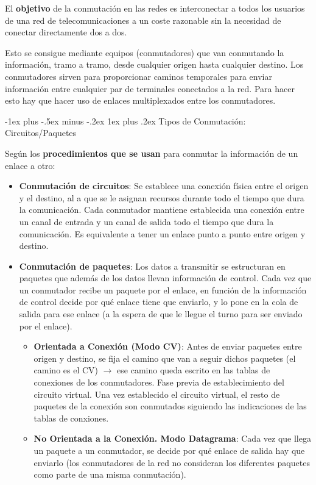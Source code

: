 \documentclass[10pt,portrait, twocolumn]{article}
\makeatletter
\renewcommand{\subsubsection}{\@startsection{subsubsection}{3}{0mm}%
                                {-1ex plus -.5ex minus -.2ex}%
                                {1ex plus .2ex}%
                                {\normalfont\small\bfseries}}
\makeatother
\begin{document}
El \textbf{objetivo} de la conmutación en las redes es interconectar a todos los usuarios de una red de telecomunicaciones a un coste razonable sin la necesidad de conectar directamente dos a dos.

\quad Esto se consigue mediante equipos (conmutadores) que van conmutando la información, tramo a tramo, desde cualquier origen hasta cualquier destino. Los conmutadores sirven para proporcionar caminos temporales para enviar información entre cualquier par de terminales conectados a la red. Para hacer esto hay que hacer uso de enlaces multiplexados entre los conmutadores.

\subsubsection{Tipos de Conmutación: Circuitos/Paquetes}

Según los \textbf{procedimientos que se usan} para conmutar la información de un enlace a otro:

\begin{itemize}
	\item \textbf{Conmutación de circuitos}: Se establece una conexión física entre el origen y el destino, al a que se le asignan recursos durante todo el tiempo que dura la comunicación. Cada conmutador mantiene establecida una conexión entre un canal de entrada y un canal de salida todo el tiempo que dura la comunicación. Es equivalente a tener un enlace punto a punto entre origen y destino.
	\item \textbf{Conmutación de paquetes}: Los datos a transmitir se estructuran en paquetes que además de los datos llevan información de control. Cada vez que un conmutador recibe un paquete por el enlace, en función de la información de control decide por qué enlace tiene que enviarlo, y lo pone en la cola de salida para ese enlace (a la espera de que le llegue el turno para ser enviado por el enlace).
	
	\begin{itemize}
		\item \textbf{Orientada a Conexión (Modo CV)}: Antes de enviar paquetes entre origen y destino, se fija el camino que van a seguir dichos paquetes (el camino es el CV) $\rightarrow$ ese camino queda escrito en las tablas de conexiones de los conmutadores. Fase previa de establecimiento del circuito virtual. Una vez establecido el circuito virtual, el resto de paquetes de la conexión son conmutados siguiendo las indicaciones de las tablas de conxiones.
		\item \textbf{No Orientada a la Conexión. Modo Datagrama}: Cada vez que llega un paquete a un conmutador, se decide por qué enlace de salida hay que enviarlo (los conmutadores de la red no consideran los diferentes paquetes como parte de una misma conmutación).
	\end{itemize}
\end{itemize}
\end{document}
